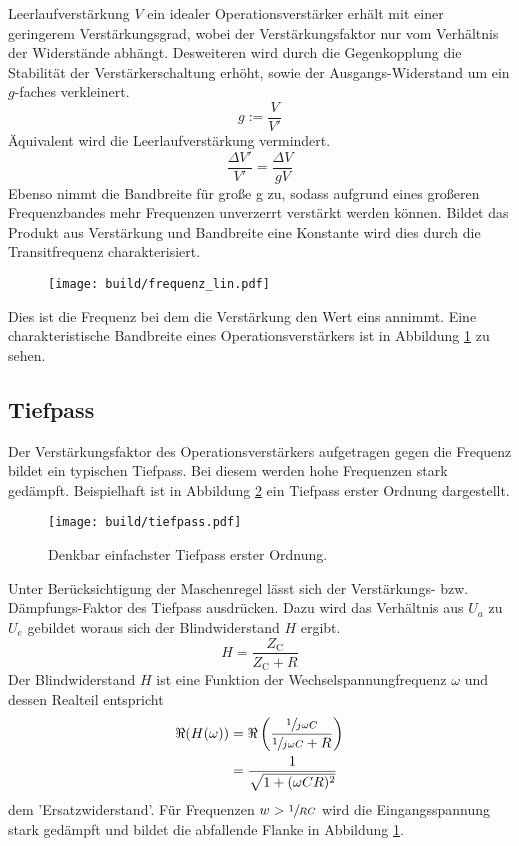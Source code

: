 Leerlaufverstärkung $V$ ein idealer Operationsverstärker erhält mit einer
geringerem Verstärkungsgrad, wobei der Verstärkungsfaktor nur vom Verhältnis
der Widerstände abhängt.
Desweiteren wird durch die Gegenkopplung die Stabilität der
Verstärkerschaltung erhöht, sowie der Ausgangs-Widerstand um ein $g$-faches
verkleinert.
\begin{equation}
		g := \frac{V}{V'}
\end{equation}
Äquivalent wird die Leerlaufverstärkung vermindert.
\begin{equation}
		\frac{\Delta V'}{V'} = \frac{\Delta V}{g V}
\end{equation}
Ebenso nimmt die Bandbreite für große g zu, sodass aufgrund eines großeren
Frequenzbandes mehr Frequenzen unverzerrt verstärkt werden können.
Bildet das Produkt aus Verstärkung und Bandbreite eine Konstante wird dies
durch die Transitfrequenz charakterisiert.
\begin{figure}[h]
		\centering
		\texttt{[image: build/frequenz\_lin.pdf]}
		\caption{\cite{anleitung}}
		\label{fig:freq}
\end{figure}
Dies ist die Frequenz bei dem die Verstärkung den Wert eins annimmt.
Eine charakteristische Bandbreite eines Operationsverstärkers ist in Abbildung
\ref{fig:freq} zu sehen.

\subsection{Tiefpass}%
\label{sub:tiefpass}

Der Verstärkungsfaktor des Operationsverstärkers aufgetragen gegen die Frequenz bildet ein typischen
Tiefpass.
Bei diesem werden hohe Frequenzen stark gedämpft. 
Beispielhaft ist in Abbildung \ref{fig:tiefpass} ein Tiefpass erster Ordnung
dargestellt.
\begin{figure}[h]
		\centering
		\texttt{[image: build/tiefpass.pdf]}
		\caption{Denkbar einfachster Tiefpass erster Ordnung. \cite{wiki}}
		\label{fig:tiefpass}
\end{figure}
Unter Berücksichtigung der Maschenregel lässt sich der Verstärkungs- bzw.
Dämpfungs-Faktor des Tiefpass ausdrücken. 
Dazu wird das Verhältnis aus $U_a$ zu $U_e$ gebildet woraus sich der
Blindwiderstand $H$ ergibt.
\begin{equation}
		\label{eq:blindwiederstand}
		H = \frac{Z_\text{C}}{Z_\text{C} + R} 
\end{equation}
Der Blindwiderstand $H$ ist eine Funktion der Wechselspannungfrequenz $\omega$
und dessen Realteil entspricht 
\begin{align}
		\label{eq:h_betrag}
		\Re(H(\omega))  &= \Re \left(\frac{\sfrac{1}{j \omega C}}{\sfrac{1}{j\omega 
		C} + R} \right) \\
								 &= \frac{1}{\sqrt{1 + (\omega CR)^2}}
\end{align}
dem 'Ersatzwiderstand'.
Für Frequenzen $w > \sfrac{1}{RC}$ wird die Eingangsspannung stark gedämpft und bildet
die abfallende Flanke in Abbildung \ref{fig:freq}.

